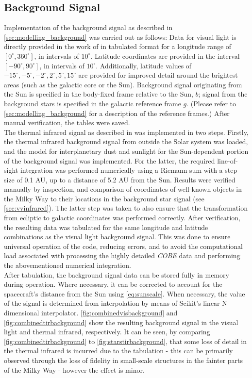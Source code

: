 \subsection{Background Signal}
Implementation of the background signal as described in \autoref{sec:modelling_background} was carried out as follows: Data for visual light is directly provided in the work of \cite{LightOfTheNightSky} in tabulated format for a longitude range of $[0^\circ, 360^\circ]$, in intervals of $10^\circ$. Latitude coordinates are provided in the interval $[-90^\circ, 90^\circ]$, in intervals of $10^\circ$. Additionally, latitude values of $-15^\circ, -5^\circ, -2^\circ, 2^\circ, 5^\circ, 15^\circ$ are provided for improved detail around the brightest areas (such as the galactic core or the Sun). Background signal originating from the Sun is specified in the body-fixed frame relative to the Sun, $b$; signal from the background stars is specified in the galactic reference frame $g$. (Please refer to \autoref{sec:modelling_background} for a description of the reference frames.) After manual verification, the tables were saved. \\

The thermal infrared signal as described in \cite{IRDust} was implemented in two steps. Firstly, the thermal infrared background signal from outside the Solar system was loaded, and the model for interplanetary dust and sunlight for the Sun-dependent portion of the background signal was implemented. For the latter, the required line-of-sight integration was performed numerically using a Riemann sum with a step size of 0.1 AU, up to a distance of 5.2 AU from the Sun. Results were verified manually by inspection, and comparison of coordinates of well-known objects in the Milky Way to their locations in the background star signal (see \autoref{sec:vvinfrared}). The latter step was taken to also ensure that the transformation from ecliptic to galactic coordinates was performed correctly. After verification, the resulting data was tabulated for the same longitude and latitude combinations as the visual light background signal. This was done to ensure universal operation of the code, reducing errors, and to avoid the computational load associated with processing the highly detailed \textit{COBE} data and performing the abovementioned numerical integration. \\

After tabulation, the background signal data can be stored fully in memory during operation. Where necessary, it can be corrected to account for the spacecraft's distance from the Sun using \autoref{eq:sunscale}. When necessary, the value of the signal is determined from interpolation by means of Scikit's linear N-dimensional interpolator. \autoref{fig:combinedvisbackground} and \autoref{fig:combinedtirbackground} show the resulting background signal in the visual light and thermal infrared, respectively. It can be seen, by comparing \autoref{fig:combinedtirbackground} to \autoref{fig:starstirbackground}, that some loss of detail in the thermal infrared is incurred due to the tabulation - this can be primarily observed through the loss of fidelity in small-scale structures in the fainter parts of the Milky Way - however the effect is minor.

